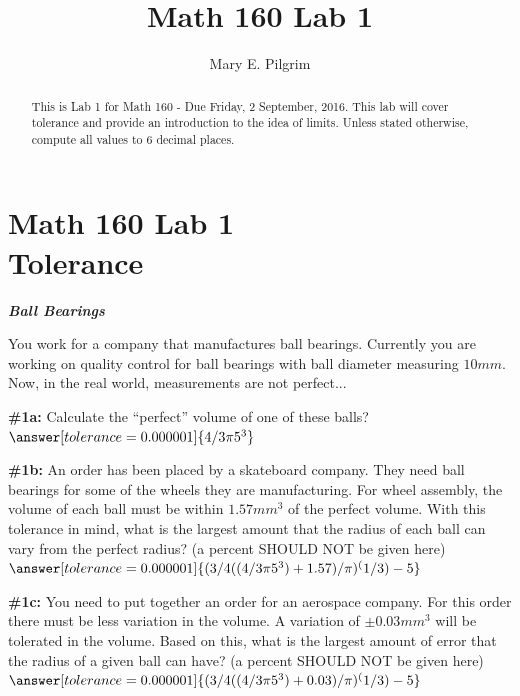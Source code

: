 \documentclass[handout,nooutcomes]{ximera}
\title{Math 160 Lab 1}
\author{Mary E. Pilgrim}
\begin{document}
\section{Math 160 Lab 1 \\ Tolerance}

\begin{abstract}
This is Lab 1 for Math 160 - Due Friday, 2 September, 2016. This lab will cover tolerance and provide an introduction to the idea of limits. Unless stated otherwise, compute all values to $6$ decimal places.
\end{abstract}

\maketitle

\begin{problem}{\textbf{\textit{Ball Bearings}}}

You work for a company that manufactures ball bearings. Currently you are working on quality control for ball bearings with ball diameter measuring $10mm$. Now, in the real world, measurements are not perfect...
    \begin{problem}{\textbf{\#1a:}}
    Calculate the ``perfect'' volume of one of these balls?
    $\answer[tolerance=0.000001]{4/3 \pi 5^3}$
    \end{problem}
    \begin{problem}{\textbf{\#1b:}}
    An order has been placed by a skateboard company. They need ball bearings for some of the wheels they are manufacturing. For wheel assembly, the volume of each ball must be within $1.57mm^3$ of the perfect volume. With this tolerance in mind, what is the largest amount that the radius of each ball can vary from the perfect radius? (a percent SHOULD NOT be given here)
    $\answer[tolerance=0.000001]{(3/4((4/3 \pi 5^3)+1.57)/\pi)^(1/3)-5}$
    \end{problem}
    \begin{problem}{\textbf{\#1c:}}
    You need to put together an order for an aerospace company. For this order there must be less variation in the volume. A variation of $\pm0.03mm^3$ will be tolerated in the volume. Based on this, what is the largest amount of error that the radius of a given ball can have? (a percent SHOULD NOT be given here)
    $\answer[tolerance=0.000001]{(3/4((4/3 \pi 5^3)+0.03)/\pi)^(1/3)-5}$    
    \end{problem}
\end{problem}
\end{document}
